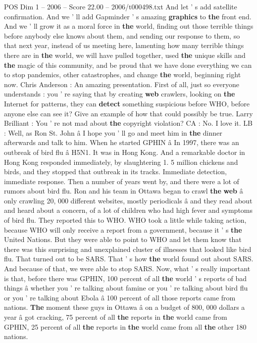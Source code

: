 \begin{textsample}{POS Dim 1 – 2006 – Score 22.00 – 2006/t000498.txt}
And let ' s add satellite confirmation.
And we ' ll add Gapminder ' s amazing \textbf{graphics} to \textbf{the} front end.
And we ' ll grow it as a moral force in \textbf{the} world, finding out those terrible things before anybody else knows about them, and sending our response to them, so that next year, instead of us meeting here, lamenting how many terrible things there are in \textbf{the} world, we will have pulled together, used \textbf{the} unique skills and \textbf{the} magic of this community, and be proud that we have done everything we can to stop pandemics, other catastrophes, and change \textbf{the} world, beginning right now.
Chris Anderson : An amazing presentation.
First of all, just so everyone understands : you ' re saying that by creating \textbf{web} crawlers, looking on \textbf{the} Internet for patterns, they can \textbf{detect} something suspicious before WHO, before anyone else can see it?
Give an example of how that could possibly be true.
Larry Brilliant : You ' re not mad about \textbf{the} copyright violation?
CA : No.
I love it.
LB : Well, as Ron St.
John â I hope you ' ll go and meet him in \textbf{the} dinner afterwards and talk to him.
When he started GPHIN â In 1997, there was an outbreak of bird flu â H5N1.
It was in Hong Kong.
And a remarkable doctor in Hong Kong responded immediately, by slaughtering 1. 5 million chickens and birds, and they stopped that outbreak in its tracks.
Immediate detection, immediate response.
Then a number of years went by, and there were a lot of rumors about bird flu.
Ron and his team in Ottawa began to crawl \textbf{the} \textbf{web} â only crawling 20, 000 different websites, mostly periodicals â and they read about and heard about a concern, of a lot of children who had high fever and symptoms of bird flu.
They reported this to WHO.
WHO took a little while taking action, because WHO will only receive a report from a government, because it ' s \textbf{the} United Nations.
But they were able to point to WHO and let them know that there was this surprising and unexplained cluster of illnesses that looked like bird flu.
That turned out to be SARS.
That ' s how \textbf{the} world found out about SARS.
And because of that, we were able to stop SARS.
Now, what ' s really important is that, before there was GPHIN, 100 percent of all \textbf{the} world ' s reports of bad things â whether you ' re talking about famine or you ' re talking about bird flu or you ' re talking about Ebola â 100 percent of all those reports came from nations. \textbf{The} moment these guys in Ottawa â on a budget of 800, 000 dollars a year â got cracking, 75 percent of all \textbf{the} reports in \textbf{the} world came from GPHIN, 25 percent of all \textbf{the} reports in \textbf{the} world came from all \textbf{the} other 180 nations.

\end{textsample}
